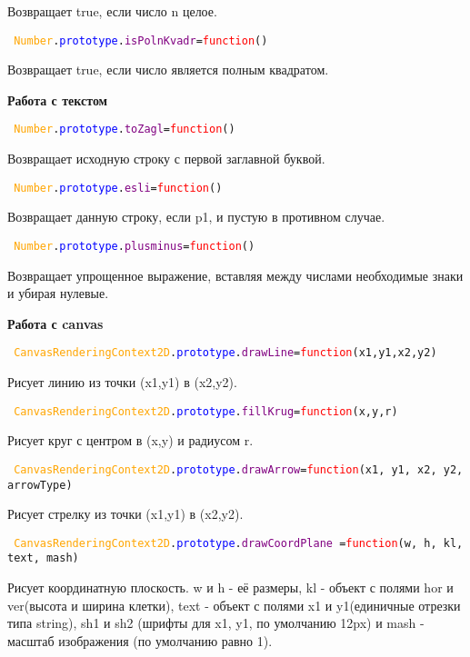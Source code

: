 Возвращает true, если число n целое.

\texttt{
	\textcolor{Orange}{Number}.\textcolor{Blue}{prototype}.\textcolor{Purple}{isPolnKvadr}=\textcolor{Red}{function}()
}

Возвращает true, если число является полным квадратом.

\textbf{Работа с текстом}

\hypertarget{toZagl}{\texttt{
		\textcolor{Orange}{Number}.\textcolor{Blue}{prototype}.\textcolor{Purple}{toZagl}=\textcolor{Red}{function}()
	}}

Возвращает исходную строку с первой заглавной буквой.

\texttt{
	\textcolor{Orange}{Number}.\textcolor{Blue}{prototype}.\textcolor{Purple}{esli}=\textcolor{Red}{function}()
}

Возвращает данную строку, если p1, и пустую в противном случае.

\texttt{
	\textcolor{Orange}{Number}.\textcolor{Blue}{prototype}.\textcolor{Purple}{plusminus}=\textcolor{Red}{function}()
}

Возвращает упрощенное выражение, вставляя между числами необходимые знаки и убирая нулевые.

\textbf{Работа с canvas}

\texttt{
	\textcolor{Orange}{CanvasRenderingContext2D}.\textcolor{Blue}{prototype}.\textcolor{Purple}{drawLine}=\textcolor{Red}{function}(x1,y1,x2,y2)
}

Рисует линию из точки (x1,y1) в (x2,y2).

\texttt{
	\textcolor{Orange}{CanvasRenderingContext2D}.\textcolor{Blue}{prototype}.\textcolor{Purple}{fillKrug}=\textcolor{Red}{function}(x,y,r)
}

Рисует круг с центром в (x,y) и радиусом r.

\texttt{
	\textcolor{Orange}{CanvasRenderingContext2D}.\textcolor{Blue}{prototype}.\textcolor{Purple}{drawArrow}=\textcolor{Red}{function}(x1, y1, x2, y2, arrowType)
}%

Рисует стрелку из точки (x1,y1) в (x2,y2).

\hypertarget{drawCoordPlane}{\texttt{
		\textcolor{Orange}{CanvasRenderingContext2D}.\textcolor{Blue}{prototype}.\textcolor{Purple}{drawCoordPlane }=\textcolor{Red}{function}(w, h, kl, text, mash)
	}}

Рисует координатную плоскость. w и h  \-- её размеры, kl \-- объект с полями hor и ver(высота и ширина клетки), text \-- объект с полями x1 и y1(единичные отрезки типа string), sh1 и sh2 (шрифты для x1, y1, по умолчанию 12px) и mash - масштаб изображения (по умолчанию равно 1).


